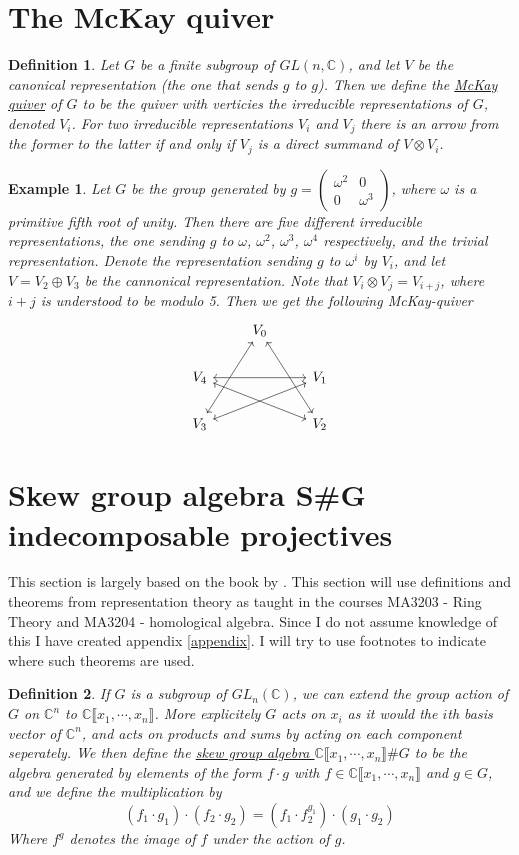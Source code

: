 \documentclass[11pt, a4paper, english]{article}
\numberwithin{prop}{section}
\numberwithin{lemma}{section}
\numberwithin{theorem}{section}
\newtheorem{defin}{Definition}
\numberwithin{defin}{section}
\newtheorem{example}{Example}
\numberwithin{example}{section}
\newcommand{\C}{\mathbb{C}}
\begin{document}
\section{The McKay quiver}
\begin{defin}
Let $G$ be a finite subgroup of $GL(n, \C)$, and let $V$ be the canonical representation (the one that sends $g$ to $g$). Then we define the \underline{McKay quiver} of $G$ to be the quiver with verticies the irreducible representations of $G$, denoted $V_i$. For two irreducible representations $V_i$ and $V_j$ there is an arrow from the former to the latter if and only if $V_j$ is a direct summand of $V \otimes V_i$. 
\end{defin}

\begin{example}
Let $G$ be the group generated by $g =\begin{pmatrix}
\omega^2 & 0\\
0 & \omega^{3}
\end{pmatrix}$, where $\omega$ is a primitive fifth root of unity. Then there are five different irreducible representations, the one sending $g$ to $\omega$, $\omega^2$, $\omega^3$, $\omega^4$ respectively, and the trivial representation. Denote the representation sending $g$ to $\omega^i$ by $V_i$, and let $V = V_2 \oplus V_3$ be the cannonical representation. Note that $V_i \otimes V_j = V_{i+j}$, where $i+j$ is understood to be modulo 5. Then we get the following McKay-quiver
$$
\begin{tikzcd}
& V_0 \arrow[<->]{ddr} \arrow[<->]{ddl} & \\
V_4 && V_1 \arrow[<->]{ll}\arrow[<->]{dll}\\
V_3 && V_2 \arrow[<->]{ull}
\end{tikzcd}  
$$
\end{example}

\section{Skew group algebra S\#G indecomposable projectives}
This section is largely based on the book by \cite{CMR}. This section will use definitions and theorems from representation theory as taught in the courses MA3203 - Ring Theory and MA3204 - homological algebra. Since I do not assume knowledge of this I have created appendix \ref{appendix}. I will try to use footnotes to indicate where such theorems are used.

\begin{defin}
If $G$ is a subgroup of $GL_n(\C)$, we can extend the group action of $G$ on $\C^n$ to $\C\llbracket x_1, \cdots, x_n\rrbracket$. More explicitely $G$ acts on $x_i$ as it would the $i$th basis vector of $\C^n$, and acts on products and sums by acting on each component seperately. We then define the \underline{skew group algebra $\C \llbracket x_1, \cdots, x_n \rrbracket \# G$} to be the algebra generated by elements of the form $f \cdot g$ with $f \in \C\llbracket x_1, \cdots, x_n\rrbracket$ and $g \in G$, and we define the multiplication by
$$ (f_1 \cdot g_1) \cdot (f_2 \cdot g_2) = (f_1 \cdot f_2^{g_1}) \cdot (g_1 \cdot g_2) $$
Where $f^g$ denotes the image of $f$ under the action of $g$.
\end{defin}
\end{document}

